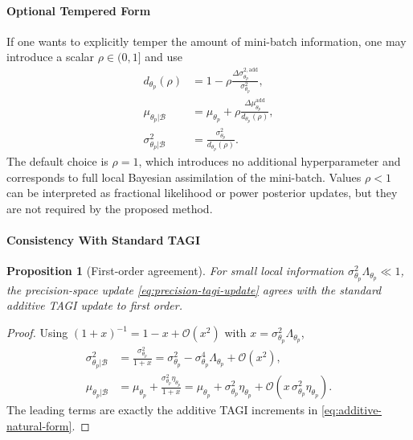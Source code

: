\documentclass[11pt]{article}
\newtheorem{proposition}{Proposition}
\begin{document}
\paragraph{Optional Tempered Form}
If one wants to explicitly temper the amount of mini-batch information, one
may introduce a scalar
\(
\rho\in(0,1]
\)
and use
\begin{equation}
\begin{aligned}
    d_{\theta_p}(\rho)
    &=
    1
    -
    \rho
    \frac{
    \Delta \sigma_{\theta_p}^{2,\mathrm{add}}
    }{
    \sigma^2_{\theta_p}
    },
    \\
    \mu_{\theta_p|\mathcal{B}}
    &=
    \mu_{\theta_p}
    +
    \rho
    \frac{
    \Delta \mu_{\theta_p}^{\mathrm{add}}
    }{
    d_{\theta_p}(\rho)
    },
    \\
    \sigma^2_{\theta_p|\mathcal{B}}
    &=
    \frac{\sigma^2_{\theta_p}}{d_{\theta_p}(\rho)}.
\end{aligned}
\label{eq:tempered-precision-update}
\end{equation}
The default choice is
\(
\rho=1
\),
which introduces no additional hyperparameter and corresponds to full local
Bayesian assimilation of the mini-batch. Values
\(
\rho<1
\)
can be interpreted as fractional likelihood or power posterior updates, but
they are not required by the proposed method.

\paragraph{Consistency With Standard TAGI}
\begin{proposition}[First-order agreement]
For small local information
\(
\sigma^2_{\theta_p}\Lambda_{\theta_p}\ll 1
\),
the precision-space update \eqref{eq:precision-tagi-update} agrees with the
standard additive TAGI update to first order.
\end{proposition}

\begin{proof}
Using
\(
(1+x)^{-1}=1-x+\mathcal{O}(x^2)
\)
with
\(
x=\sigma^2_{\theta_p}\Lambda_{\theta_p}
\),
\begin{align}
    \sigma^2_{\theta_p|\mathcal{B}}
    &=
    \frac{\sigma^2_{\theta_p}}{1+x}
     =
    \sigma^2_{\theta_p}
    -
    \sigma^4_{\theta_p}\Lambda_{\theta_p}
    +
    \mathcal{O}(x^2),
    \\
    \mu_{\theta_p|\mathcal{B}}
    &=
    \mu_{\theta_p}
    +
    \frac{\sigma^2_{\theta_p}\eta_{\theta_p}}{1+x}
     =
    \mu_{\theta_p}
    +
    \sigma^2_{\theta_p}\eta_{\theta_p}
    +
    \mathcal{O}(x\,\sigma^2_{\theta_p}\eta_{\theta_p}).
\end{align}
The leading terms are exactly the additive TAGI increments in
\eqref{eq:additive-natural-form}.
\end{proof}
\end{document}
